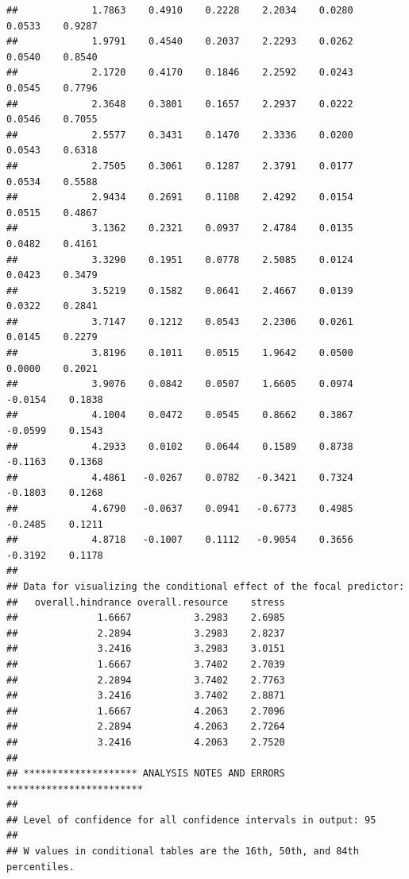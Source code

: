 \documentclass[
  man]{apa6}
\begin{document}
\begin{verbatim}
##             1.7863    0.4910    0.2228    2.2034    0.0280    0.0533    0.9287
##             1.9791    0.4540    0.2037    2.2293    0.0262    0.0540    0.8540
##             2.1720    0.4170    0.1846    2.2592    0.0243    0.0545    0.7796
##             2.3648    0.3801    0.1657    2.2937    0.0222    0.0546    0.7055
##             2.5577    0.3431    0.1470    2.3336    0.0200    0.0543    0.6318
##             2.7505    0.3061    0.1287    2.3791    0.0177    0.0534    0.5588
##             2.9434    0.2691    0.1108    2.4292    0.0154    0.0515    0.4867
##             3.1362    0.2321    0.0937    2.4784    0.0135    0.0482    0.4161
##             3.3290    0.1951    0.0778    2.5085    0.0124    0.0423    0.3479
##             3.5219    0.1582    0.0641    2.4667    0.0139    0.0322    0.2841
##             3.7147    0.1212    0.0543    2.2306    0.0261    0.0145    0.2279
##             3.8196    0.1011    0.0515    1.9642    0.0500    0.0000    0.2021
##             3.9076    0.0842    0.0507    1.6605    0.0974   -0.0154    0.1838
##             4.1004    0.0472    0.0545    0.8662    0.3867   -0.0599    0.1543
##             4.2933    0.0102    0.0644    0.1589    0.8738   -0.1163    0.1368
##             4.4861   -0.0267    0.0782   -0.3421    0.7324   -0.1803    0.1268
##             4.6790   -0.0637    0.0941   -0.6773    0.4985   -0.2485    0.1211
##             4.8718   -0.1007    0.1112   -0.9054    0.3656   -0.3192    0.1178
## 
## Data for visualizing the conditional effect of the focal predictor:
##   overall.hindrance overall.resource    stress
##              1.6667           3.2983    2.6985
##              2.2894           3.2983    2.8237
##              3.2416           3.2983    3.0151
##              1.6667           3.7402    2.7039
##              2.2894           3.7402    2.7763
##              3.2416           3.7402    2.8871
##              1.6667           4.2063    2.7096
##              2.2894           4.2063    2.7264
##              3.2416           4.2063    2.7520
## 
## ******************** ANALYSIS NOTES AND ERRORS ************************ 
## 
## Level of confidence for all confidence intervals in output: 95
## 
## W values in conditional tables are the 16th, 50th, and 84th percentiles.
\end{verbatim}
\end{document}
